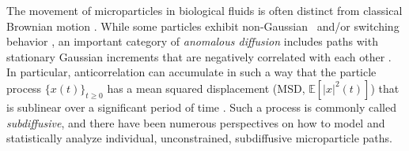\documentclass[11pt]{amsart}
\theoremstyle{definition}
\newcommand{\E}[1]{\mathbb{E}\left[#1\right]}
\theoremstyle{definition}
\theoremstyle{plain}
\numberwithin{equation}{section}
\begin{document}
The movement of microparticles in biological fluids is often distinct from classical Brownian motion \cite{hofling2013anomalous}. While some particles exhibit non-Gaussian~\cite{wang2012brownian, lampo2017cytoplasmic} and/or switching behavior \cite{metzler2014anomalous, newby2017blueprint}, an important category of \emph{anomalous diffusion} includes paths with stationary Gaussian increments that are negatively correlated with each other \cite{kou2008stochastic, ernst2012fractional, weber2012analytical, hill2014biophysical}.  In particular, anticorrelation can accumulate in such a way that the particle process $\{x(t)\}_{t \geq 0}$ has a mean squared displacement (MSD, $\E{|x|^2(t)}$) that is sublinear over a significant period of time \cite{morgado2002relation, kupferman2004fractional,mckinley2017anomalous}. Such a process is commonly called \emph{subdiffusive}, and there have been numerous perspectives on how to model \cite{mason1995optical, kou2004general,kupferman2004fractional, mckinley2009transient, indei2012treating, goychuk2012viscoelastic,hohenegger2017fluid} and statistically analyze \cite{kou2008stochastic,fricks2009time, cordoba2012elimination, meroz2013test, lysy2016model,hohenegger2018reconstructing} individual, unconstrained, subdiffusive microparticle paths. 
\end{document}
